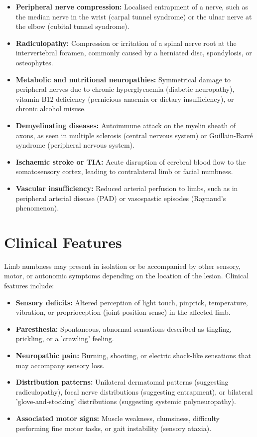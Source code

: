 \begin{itemize}
    \item \textbf{Peripheral nerve compression:} Localised entrapment of a nerve, such as the median nerve in the wrist (carpal tunnel syndrome) or the ulnar nerve at the elbow (cubital tunnel syndrome).
    \item \textbf{Radiculopathy:} Compression or irritation of a spinal nerve root at the intervertebral foramen, commonly caused by a herniated disc, spondylosis, or osteophytes.
    \item \textbf{Metabolic and nutritional neuropathies:} Symmetrical damage to peripheral nerves due to chronic hyperglycaemia (diabetic neuropathy), vitamin B12 deficiency (pernicious anaemia or dietary insufficiency), or chronic alcohol misuse.
    \item \textbf{Demyelinating diseases:} Autoimmune attack on the myelin sheath of axons, as seen in multiple sclerosis (central nervous system) or Guillain-Barré syndrome (peripheral nervous system).
    \item \textbf{Ischaemic stroke or TIA:} Acute disruption of cerebral blood flow to the somatosensory cortex, leading to contralateral limb or facial numbness.
    \item \textbf{Vascular insufficiency:} Reduced arterial perfusion to limbs, such as in peripheral arterial disease (PAD) or vasospastic episodes (Raynaud's phenomenon).
\end{itemize}

\section*{Clinical Features}
Limb numbness may present in isolation or be accompanied by other sensory, motor, or autonomic symptoms depending on the location of the lesion. Clinical features include:

\begin{itemize}
    \item \textbf{Sensory deficits:} Altered perception of light touch, pinprick, temperature, vibration, or proprioception (joint position sense) in the affected limb.
    \item \textbf{Paresthesia:} Spontaneous, abnormal sensations described as tingling, prickling, or a 'crawling' feeling.
    \item \textbf{Neuropathic pain:} Burning, shooting, or electric shock-like sensations that may accompany sensory loss.
    \item \textbf{Distribution patterns:} Unilateral dermatomal patterns (suggesting radiculopathy), focal nerve distributions (suggesting entrapment), or bilateral 'glove-and-stocking' distributions (suggesting systemic polyneuropathy).
    \item \textbf{Associated motor signs:} Muscle weakness, clumsiness, difficulty performing fine motor tasks, or gait instability (sensory ataxia).
\end{itemize}

